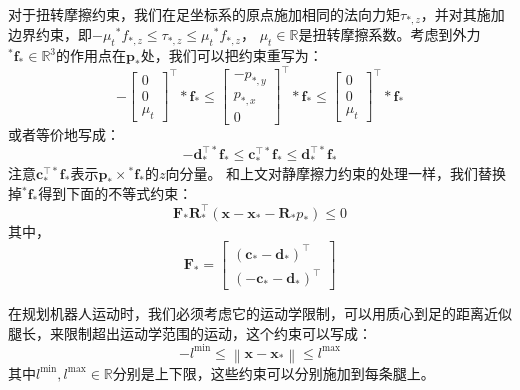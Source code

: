 对于扭转摩擦约束，我们在足坐标系的原点施加相同的法向力矩$\tau_{*, z}$，并对其施加边界约束，即$-\mu_t{ }^* f_{*, z} \leq \tau_{*, z} \leq \mu_t{ }^* f_{*, z}$，
$\mu_t \in \mathbb{R}$是扭转摩擦系数。考虑到外力${ }^* \boldsymbol{f}_* \in \mathbb{R}^{3}$的作用点在$\boldsymbol{p}_*$处，我们可以把约束重写为：
\begin{equation}
    \label{equ:friction_final}
    -\left[\begin{array}{c}
        0 \\
        0 \\
        \mu_t
        \end{array}\right]^{\top} * \boldsymbol{f}_* \leq\left[\begin{array}{c}
        -p_{*, y} \\
        p_{*, x} \\
        0
        \end{array}\right]^{\top} * \boldsymbol{f}_* \leq\left[\begin{array}{c}
        0 \\
        0 \\
        \mu_t
        \end{array}\right]^{\top} * \boldsymbol{f}_*
\end{equation}
或者等价地写成：
\begin{equation}
    \label{equ:friction_vector}
    -\boldsymbol{d}_*^{\top *} \boldsymbol{f}_* \leq \boldsymbol{c}_*^{\top *} \boldsymbol{f}_* \leq \boldsymbol{d}_*^{\top *} \boldsymbol{f}_*
\end{equation}
注意$\boldsymbol{c}_*^{\top *} \boldsymbol{f}_*$表示$\boldsymbol{p}_* \times { }^* \boldsymbol{f}_*$的$z$向分量。
和上文对静摩擦力约束的处理一样，我们替换掉${ }^* \boldsymbol{f}_*$得到下面的不等式约束：
\begin{equation}
    \label{equ:friction_stack}
    \boldsymbol{F}_* \boldsymbol{R}_*^{\top}\left(\boldsymbol{x}-\boldsymbol{x}_*-\boldsymbol{R}_* p_*\right) \leq 0
\end{equation}
其中，
\begin{equation}
    \label{equ:friction_F}
    \boldsymbol{F}_*=\left[\begin{array}{c}
        \left(\boldsymbol{c}_*-\boldsymbol{d}_*\right)^{\top} \\
        \left(-\boldsymbol{c}_*-\boldsymbol{d}_*\right)^{\top}
        \end{array}\right]
\end{equation}

在规划机器人运动时，我们必须考虑它的运动学限制，可以用质心到足的距离近似腿长，来限制超出运动学范围的运动，这个约束可以写成：
\begin{equation}
    \label{equ:kine_constraint}
    -l^{\min } \leq\left\|\boldsymbol{x}-\boldsymbol{x}_*\right\| \leq l^{\max }
\end{equation}
其中$l^{\min}, l^{\max} \in \mathbb{R}$分别是上下限，这些约束可以分别施加到每条腿上。

